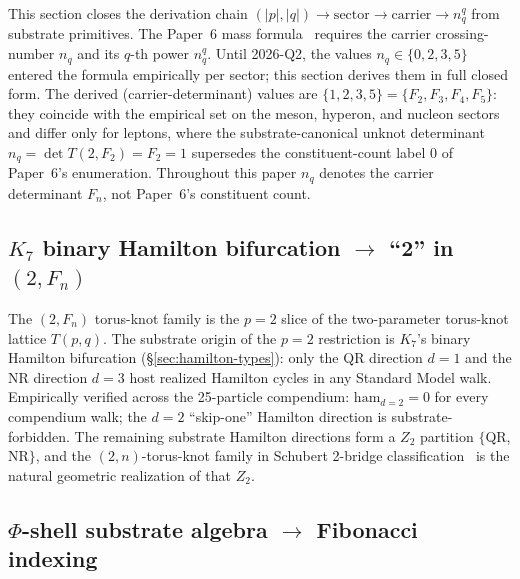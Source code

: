 \documentclass[11pt]{article}
\begin{document}
This section closes the derivation chain $(|p|, |q|) \to \mathrm{sector} \to \mathrm{carrier} \to n_q^q$ from substrate primitives.  The Paper~6 mass formula~\cite{Paper6} requires the carrier crossing-number $n_q$ and its $q$-th power $n_q^q$.  Until 2026-Q2, the values $n_q \in \{0, 2, 3, 5\}$ entered the formula empirically per sector; this section derives them in full closed form.  The derived (carrier-determinant) values are $\{1, 2, 3, 5\} = \{F_2, F_3, F_4, F_5\}$: they coincide with the empirical set on the meson, hyperon, and nucleon sectors and differ only for leptons, where the substrate-canonical unknot determinant $n_q = \det T(2, F_2) = F_2 = 1$ supersedes the constituent-count label $0$ of Paper~6's enumeration.  Throughout this paper $n_q$ denotes the carrier determinant $F_n$, not Paper~6's constituent count.

\subsection{$K_7$ binary Hamilton bifurcation $\to$ ``2'' in $(2, F_n)$}
\label{sec:hamilton-bifurcation-2}

The $(2, F_n)$ torus-knot family is the $p = 2$ slice of the two-parameter torus-knot lattice $T(p, q)$.  The substrate origin of the $p = 2$ restriction is $K_7$'s binary Hamilton bifurcation (\S\ref{sec:hamilton-types}): only the QR direction $d = 1$ and the NR direction $d = 3$ host realized Hamilton cycles in any Standard Model walk.  Empirically verified across the 25-particle compendium: $\mathrm{ham}_{d = 2} = 0$ for every compendium walk; the $d = 2$ ``skip-one'' Hamilton direction is substrate-forbidden.  The remaining substrate Hamilton directions form a $Z_2$ partition $\{$QR, NR$\}$, and the $(2, n)$-torus-knot family in Schubert 2-bridge classification~\cite{Schubert} is the natural geometric realization of that $Z_2$.

\subsection{$\Phi$-shell substrate algebra $\to$ Fibonacci indexing}
\label{sec:phi-shell-fibonacci}
\end{document}

